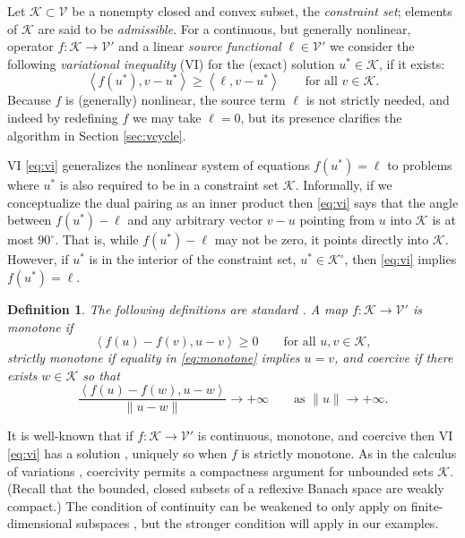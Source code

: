 \documentclass[letterpaper,final,12pt,reqno]{amsart}
\theoremstyle{cstyle}
\theoremstyle{cstyle*}
\theoremstyle{dstyle}
\newtheorem{definition}[theorem]{Definition}
\numberwithin{equation}{section}
\numberwithin{figure}{section}
\numberwithin{table}{section}
\numberwithin{theorem}{section}
\newcommand{\cK}{\mathcal{K}}
\newcommand{\cV}{\mathcal{V}}
\newcommand{\ip}[2]{\left<#1,#2\right>}
\begin{document}
Let $\cK \subset \cV$ be a nonempty closed and convex subset, the \emph{constraint set}; elements of $\cK$ are said to be \emph{admissible}.  For a continuous, but generally nonlinear, operator $f:\cK \to \cV'$ and a linear \emph{source functional} $\ell\in \cV'$ we consider the following \emph{variational inequality} (VI) for the (exact) solution $u^*\in \cK$, if it exists:
\begin{equation}
\ip{f(u^*)}{v-u^*} \ge \ip{\ell}{v-u^*} \qquad \text{for all } v\in \cK. \label{eq:vi}
\end{equation}
Because $f$ is (generally) nonlinear, the source term $\ell$ is not strictly needed, and indeed by redefining $f$ we may take $\ell=0$, but its presence clarifies the algorithm in Section \ref{sec:vcycle}.

VI \eqref{eq:vi} generalizes the nonlinear system of equations $f(u^*)=\ell$ to problems where $u^*$ is also required to be in a constraint set $\cK$.  Informally, if we conceptualize the dual pairing as an inner product then \eqref{eq:vi} says that the angle between $f(u^*)-\ell$ and any arbitrary vector $v-u$ pointing from $u$ into $\cK$ is at most $90^\circ$.  That is, while $f(u^*)-\ell$ may not be zero, it points directly into $\cK$.  However, if $u^*$ is in the interior of the constraint set, $u^*\in\cK^\circ$, then \eqref{eq:vi} implies $f(u^*)=\ell$.

\begin{definition} The following definitions are standard \cite{KinderlehrerStampacchia1980}.  A map $f:\cK \to \cV'$ is \emph{monotone} if
\begin{equation}
\ip{f(u)-f(v)}{u-v} \ge 0 \qquad \text{for all } u,v \in \cK, \label{eq:monotone}
\end{equation}
\emph{strictly monotone} if equality in \eqref{eq:monotone} implies $u=v$, and \emph{coercive} if there exists $w \in \cK$ so that
\begin{equation}
\frac{\ip{f(u)-f(w)}{u-w}}{\|u-w\|} \to +\infty \qquad \text{as } \|u\|\to +\infty. \label{eq:coercive}
\end{equation}
\end{definition}

It is well-known that if $f:\cK \to \cV'$ is continuous, monotone, and coercive then VI \eqref{eq:vi} has a solution \cite[Corollary III.1.8]{KinderlehrerStampacchia1980}, uniquely so when $f$ is strictly monotone.  As in the calculus of variations \cite{Evans2010}, coercivity permits a compactness argument for unbounded sets $\cK$.  (Recall that the bounded, closed subsets of a reflexive Banach space are weakly compact.)  The condition of continuity can be weakened to only apply on finite-dimensional subspaces \cite{KinderlehrerStampacchia1980}, but the stronger condition will apply in our examples.
\end{document}
